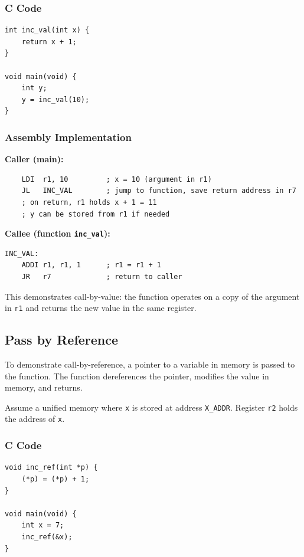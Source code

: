 \documentclass[12pt]{report}
\begin{document}
\subsubsection*{C Code}

\begin{lstlisting}
int inc_val(int x) {
    return x + 1;
}

void main(void) {
    int y;
    y = inc_val(10);
}
\end{lstlisting}

\subsubsection*{Assembly Implementation}

\textbf{Caller (main):}
\begin{lstlisting}
    LDI  r1, 10         ; x = 10 (argument in r1)
    JL   INC_VAL        ; jump to function, save return address in r7
    ; on return, r1 holds x + 1 = 11
    ; y can be stored from r1 if needed
\end{lstlisting}

\noindent \textbf{Callee (function \texttt{inc\_val}):}
\begin{lstlisting}
INC_VAL:
    ADDI r1, r1, 1      ; r1 = r1 + 1
    JR   r7             ; return to caller
\end{lstlisting}

This demonstrates call-by-value: the function operates on a copy of the argument in \texttt{r1} and returns the new value in the same register.


\subsection{Pass by Reference}

To demonstrate call-by-reference, a pointer to a variable in memory is passed to the function. The function dereferences the pointer, modifies the value in memory, and returns.

Assume a unified memory where \texttt{x} is stored at address \texttt{X\_ADDR}. Register \texttt{r2} holds the address of \texttt{x}.

\subsubsection*{C Code}

\begin{lstlisting}
void inc_ref(int *p) {
    (*p) = (*p) + 1;
}

void main(void) {
    int x = 7;
    inc_ref(&x);
}
\end{lstlisting}
\end{document}
